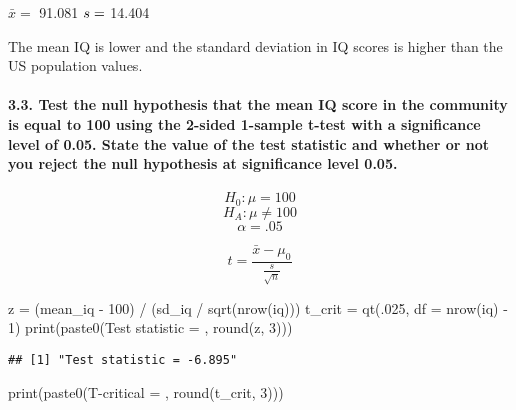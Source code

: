 \documentclass[
]{article}
\newenvironment{Shaded}{\begin{snugshade}}{\end{snugshade}}
\newcommand{\AttributeTok}[1]{\textcolor[rgb]{0.77,0.63,0.00}{#1}}
\newcommand{\DecValTok}[1]{\textcolor[rgb]{0.00,0.00,0.81}{#1}}
\newcommand{\FunctionTok}[1]{\textcolor[rgb]{0.00,0.00,0.00}{#1}}
\newcommand{\NormalTok}[1]{#1}
\newcommand{\OtherTok}[1]{\textcolor[rgb]{0.56,0.35,0.01}{#1}}
\newcommand{\SpecialCharTok}[1]{\textcolor[rgb]{0.00,0.00,0.00}{#1}}
\newcommand{\StringTok}[1]{\textcolor[rgb]{0.31,0.60,0.02}{#1}}
\begin{document}
\(\bar x=\) 91.081 \(\\s=\) 14.404

The mean IQ is lower and the standard deviation in IQ scores is higher
than the US population values.

\hypertarget{test-the-null-hypothesis-that-the-mean-iq-score-in-the-community-is-equal-to-100-using-the-2-sided-1-sample-t-test-with-a-significance-level-of-0.05.-state-the-value-of-the-test-statistic-and-whether-or-not-you-reject-the-null-hypothesis-at-significance-level-0.05.}{%
\paragraph{3.3. Test the null hypothesis that the mean IQ score in the
community is equal to 100 using the 2-sided 1-sample t-test with a
significance level of 0.05. State the value of the test statistic and
whether or not you reject the null hypothesis at significance level
0.05.}\label{test-the-null-hypothesis-that-the-mean-iq-score-in-the-community-is-equal-to-100-using-the-2-sided-1-sample-t-test-with-a-significance-level-of-0.05.-state-the-value-of-the-test-statistic-and-whether-or-not-you-reject-the-null-hypothesis-at-significance-level-0.05.}}

\[H_0: \mu = 100\] \[H_A: \mu \neq 100\] \[\alpha=.05\]

\[t= \frac{\bar x - \mu_0}{\frac{s}{\sqrt{n}}}\]

\begin{Shaded}
\begin{Highlighting}[]
\NormalTok{z }\OtherTok{=}\NormalTok{ (mean\_iq }\SpecialCharTok{{-}} \DecValTok{100}\NormalTok{) }\SpecialCharTok{/}\NormalTok{ (sd\_iq }\SpecialCharTok{/} \FunctionTok{sqrt}\NormalTok{(}\FunctionTok{nrow}\NormalTok{(iq)))}
\NormalTok{t\_crit }\OtherTok{=} \FunctionTok{qt}\NormalTok{(.}\DecValTok{025}\NormalTok{, }\AttributeTok{df =} \FunctionTok{nrow}\NormalTok{(iq) }\SpecialCharTok{{-}} \DecValTok{1}\NormalTok{)}
\FunctionTok{print}\NormalTok{(}\FunctionTok{paste0}\NormalTok{(}\StringTok{\textquotesingle{}Test statistic = \textquotesingle{}}\NormalTok{, }\FunctionTok{round}\NormalTok{(z, }\DecValTok{3}\NormalTok{)))}
\end{Highlighting}
\end{Shaded}

\begin{verbatim}
## [1] "Test statistic = -6.895"
\end{verbatim}

\begin{Shaded}
\begin{Highlighting}[]
\FunctionTok{print}\NormalTok{(}\FunctionTok{paste0}\NormalTok{(}\StringTok{\textquotesingle{}T{-}critical = \textquotesingle{}}\NormalTok{, }\FunctionTok{round}\NormalTok{(t\_crit, }\DecValTok{3}\NormalTok{)))}
\end{Highlighting}
\end{Shaded}
\end{document}
